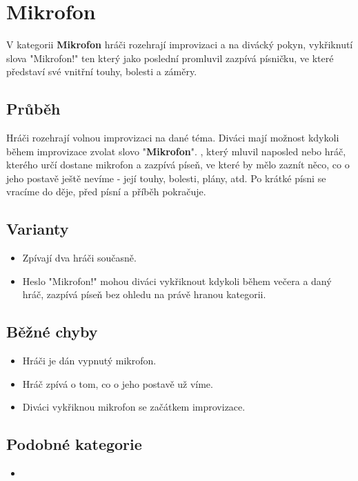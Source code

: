  
 
 
 
\needspace{5cm} \section{Mikrofon} \label{mikrofon}  
 
 
V kategorii \textbf{Mikrofon}{} hráči rozehrají improvizaci a na divácký pokyn, vykřiknutí slova "Mikrofon!"{} ten který jako poslední promluvil zazpívá písničku, ve které představí své vnitřní touhy, bolesti a záměry. 
 
 
\subsection{Průběh} Hráči rozehrají volnou improvizaci na dané téma. Diváci mají možnost kdykoli během improvizace zvolat slovo "\textbf{Mikrofon}{}". , který mluvil naposled nebo hráč, kterého určí  dostane mikrofon a zazpívá píseň, ve které by mělo zaznít něco, co o jeho postavě ještě nevíme - její touhy, bolesti, plány, atd. Po krátké písni se vracíme do děje, před písní a příběh pokračuje.  
 
\subsection{ Varianty } \begin{itemize}
\item Zpívají dva hráči současně.
\item Heslo "Mikrofon!"{} mohou diváci vykřiknout kdykoli během večera a daný hráč, zazpívá píseň bez ohledu na právě hranou kategorii.
\end{itemize}
 
\subsection{ Běžné chyby } \begin{itemize}
\item Hráči je dán vypnutý mikrofon.
\item Hráč zpívá o tom, co o jeho postavě už víme.
\item Diváci vykřiknou mikrofon se začátkem improvizace.
\end{itemize}
 
 
\subsection{ Podobné kategorie } \begin{itemize}
\item {}
\end{itemize}
 
